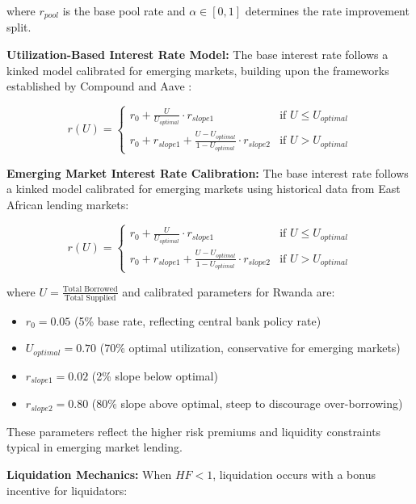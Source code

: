 \documentclass[12pt]{article}
\begin{document}
where $r_{pool}$ is the base pool rate and $\alpha \in [0,1]$ determines the rate improvement split.

\textbf{Utilization-Based Interest Rate Model:}
The base interest rate follows a kinked model calibrated for emerging markets, building upon the frameworks established by Compound \citep{compound2019whitepaper} and Aave \citep{aave2020whitepaper}:

\begin{equation}
r(U) = \begin{cases}
r_0 + \frac{U}{U_{optimal}} \cdot r_{slope1} & \text{if } U \leq U_{optimal} \\
r_0 + r_{slope1} + \frac{U - U_{optimal}}{1 - U_{optimal}} \cdot r_{slope2} & \text{if } U > U_{optimal}
\end{cases}
\end{equation}

\textbf{Emerging Market Interest Rate Calibration:}
The base interest rate follows a kinked model calibrated for emerging markets using historical data from East African lending markets:

\begin{equation}
r(U) = \begin{cases}
r_0 + \frac{U}{U_{optimal}} \cdot r_{slope1} & \text{if } U \leq U_{optimal} \\
r_0 + r_{slope1} + \frac{U - U_{optimal}}{1 - U_{optimal}} \cdot r_{slope2} & \text{if } U > U_{optimal}
\end{cases}
\end{equation}

where $U = \frac{\text{Total Borrowed}}{\text{Total Supplied}}$ and calibrated parameters for Rwanda are:
\begin{itemize}
\item $r_0 = 0.05$ (5\% base rate, reflecting central bank policy rate)
\item $U_{optimal} = 0.70$ (70\% optimal utilization, conservative for emerging markets)
\item $r_{slope1} = 0.02$ (2\% slope below optimal)
\item $r_{slope2} = 0.80$ (80\% slope above optimal, steep to discourage over-borrowing)
\end{itemize}

These parameters reflect the higher risk premiums and liquidity constraints typical in emerging market lending.

\textbf{Liquidation Mechanics:}
When $HF < 1$, liquidation occurs with a bonus incentive for liquidators:
\end{document}
